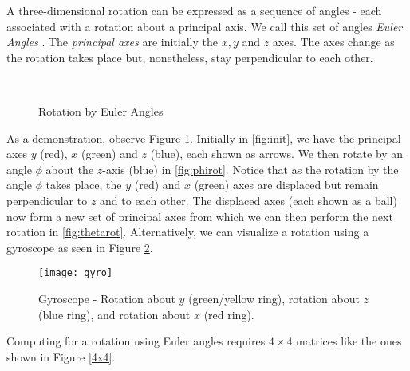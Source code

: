  A three-dimensional rotation can be expressed as a sequence of angles - each associated with a rotation about a principal axis. We call this set of angles \emph{Euler Angles} \cite{lerios} \cite{goldstein} \cite{strauch}. The \emph{principal axes} are initially the $x, y$ and $z$ axes. The axes change as the rotation takes place but, nonetheless, stay perpendicular to each other. 

\begin{figure}[H]
	\centering
	\qquad
	\\
	\qquad
	\caption{\cite{strauch} \cite{goldstein} Rotation by Euler Angles}
	\label{eulerang}
\end{figure}

 As a demonstration, observe Figure \ref{eulerang}. Initially in \ref{fig:init}, we have the principal axes $y$ (red), $x$ (green) and $z$ (blue), each shown as arrows. We then rotate by an angle $\phi$ about the $z$-axis (blue) in \ref{fig:phirot}. Notice that as the rotation by the angle $\phi$ takes place, the $y$ (red) and $x$ (green) axes are displaced but remain perpendicular to $z$ and to each other. The displaced axes (each shown as a ball) now form a new set of principal axes from which we can then perform the next rotation in \ref{fig:thetarot}. Alternatively, we can visualize a rotation using a gyroscope as seen in Figure \ref{gyroscope}.

 \begin{figure}[H]
 	\centering
	\texttt{[image: gyro]}
 	\caption{Gyroscope - Rotation about $y$ (green/yellow ring), rotation about $z$ (blue ring), and rotation about $x$ (red ring).}
 	\label{gyroscope}
 \end{figure}

Computing for a rotation using Euler angles requires $4\times 4$ matrices like the ones shown in Figure \ref{4x4}. 

